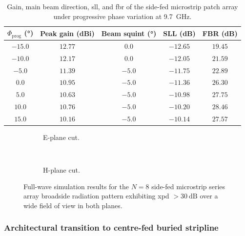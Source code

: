 \begin{table}[p]
    \centering
    \caption{Gain, main beam direction, \gls{sll}, and \gls{fbr} of the side-fed microstrip patch array under progressive phase variation at \qty{9.7}{\giga\hertz}.}
    \label{tab:radiation_performance}
    \small
    \begin{tabular}{ccccc}
        \toprule
        $\Phi_{\mathrm{prog}}$ (\unit{\degree}) & Peak gain (dBi) & Beam squint (\unit{\degree}) & SLL (dB) & FBR (dB) \\
        \midrule
        $-15.0$ & $12.77$ & $0.0$  & $-12.65$ & $19.45$ \\
        $-10.0$ & $12.17$ & $0.0$  & $-12.05$ & $21.59$ \\
        $-5.0$  & $11.39$ & $-5.0$ & $-11.75$ & $22.89$ \\
        $0.0$   & $10.95$ & $-5.0$ & $-11.36$ & $26.30$ \\
        $5.0$   & $10.63$ & $-5.0$ & $-10.98$ & $27.75$ \\
        $10.0$  & $10.76$ & $-5.0$ & $-10.20$ & $28.46$ \\
        $15.0$  & $10.16$ & $-5.0$ & $-10.14$ & $27.57$ \\
        \bottomrule
    \end{tabular}
\end{table}

\begin{figure}[p]
    \centering
    \begin{subfigure}{0.45\textwidth}
        \centering
        \resizebox{\linewidth}{!}{}
        \caption{E-plane cut.}
        \label{fig:side_fed_microstrip_array_xpd_phi90.pgf}
    \end{subfigure}
    ~
    \begin{subfigure}{0.45\textwidth}
        \centering
        \resizebox{\linewidth}{!}{}
        \caption{H-plane cut.}
        \label{fig:side_fed_microstrip_array_xpd_phi0.pgf}
    \end{subfigure}
    \caption{Full-wave simulation results for the $N=8$ side-fed microstrip series array broadside radiation pattern exhibiting \gls{xpd} $> \qty{30}{\dB}$ over a wide field of view in both planes.}
    \label{fig:side_fed_microstrip_array_xpd.pgf}
\end{figure}


\subsubsection{Architectural transition to centre-fed buried stripline}
\label{sec:architectural-transition}


